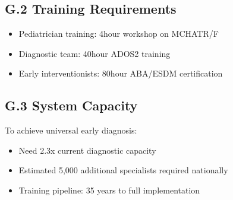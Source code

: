 \documentclass[letterpaper,10pt,english]{jupyterBook}
\begin{document}
\subsection{G.2 Training Requirements}
\label{\detokenize{appendix:g-2-training-requirements}}\begin{itemize}
\item {} 
\sphinxAtStartPar
Pediatrician training: 4\sphinxhyphen{}hour workshop on M\sphinxhyphen{}CHAT\sphinxhyphen{}R/F

\item {} 
\sphinxAtStartPar
Diagnostic team: 40\sphinxhyphen{}hour ADOS\sphinxhyphen{}2 training

\item {} 
\sphinxAtStartPar
Early interventionists: 80\sphinxhyphen{}hour ABA/ESDM certification

\end{itemize}


\subsection{G.3 System Capacity}
\label{\detokenize{appendix:g-3-system-capacity}}
\sphinxAtStartPar
To achieve universal early diagnosis:
\begin{itemize}
\item {} 
\sphinxAtStartPar
Need 2.3x current diagnostic capacity

\item {} 
\sphinxAtStartPar
Estimated 5,000 additional specialists required nationally

\item {} 
\sphinxAtStartPar
Training pipeline: 3\sphinxhyphen{}5 years to full implementation

\end{itemize}







\renewcommand{\indexname}{Index}
\printindex
\end{document}
